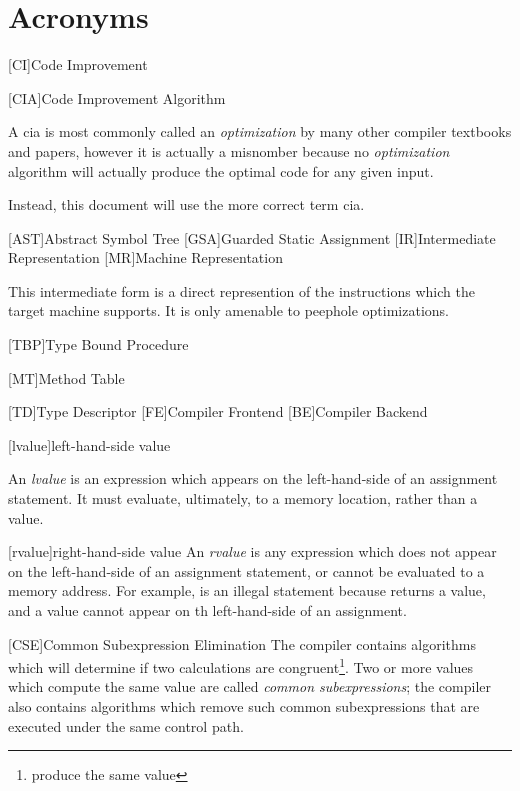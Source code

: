 \chapter{Acronyms}

\begin{acronym}
  [CI]{Code Improvement}

  [CIA]{Code Improvement Algorithm}

  A \acs{cia} is most commonly called an \emph{optimization} by many
  other compiler textbooks and papers, however it is actually a
  misnomber because no \emph{optimization} algorithm will actually
  produce the optimal code for any given input.

  Instead, this document will use the more correct term \ac{cia}.

  [AST]{Abstract Symbol Tree}
  [GSA]{Guarded Static Assignment}
  [IR]{Intermediate Representation}
  [MR]{Machine Representation}

  This intermediate form is a direct represention of the instructions
  which the target machine supports.  It is only amenable to peephole
  optimizations.

  [TBP]{Type Bound Procedure}

  [MT]{Method Table}

  [TD]{Type Descriptor}
  [FE]{Compiler Frontend}
  [BE]{Compiler Backend}

  [lvalue]{left-hand-side value}

  An \emph{lvalue} is an expression which appears on the
  left-hand-side of an assignment statement.  It must evaluate,
  ultimately, to a memory location, rather than a value.

  [rvalue]{right-hand-side value}
  An \emph{rvalue} is any expression which does not appear on the
  left-hand-side of an assignment statement, or cannot be evaluated to
  a memory address.  For example,  is an
  illegal statement because  returns a 
  value, and a value cannot appear on th left-hand-side of an
  assignment.

  [CSE]{Common Subexpression Elimination}
  The compiler contains algorithms which will determine if two
  calculations are congruent\footnote{produce the same value}.  Two or
  more values which compute the same value are called \emph{common
    subexpressions}; the compiler also contains algorithms which
  remove such common subexpressions that are executed under the same
  control path.


\end{acronym}
